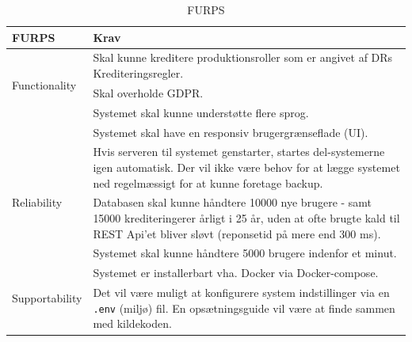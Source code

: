 \begin{table}[ht]
    \centering
    \begin{tabularx}{\textwidth}{|p{3.5cm}|X|}
        \hline
        \textbf{FURPS}                      & \textbf{Krav} \\ 
        \hline
        \multirow{3}{*}{Functionality}      & Skal kunne kreditere produktionsroller som er angivet af DRs Krediteringsregler.  \\ \cline{2-2} 
                                            & Skal overholde GDPR. \\ \hline
        \multirow{2}{*}{Usability}          & Systemet skal kunne understøtte flere sprog. \\ \cline{2-2}
                                            & Systemet skal have en responsiv brugergrænseflade (UI). \\ \hline
        \multirow{3}{*}{Reliability}        & Hvis serveren til systemet genstarter, startes del-systemerne igen automatisk. Der vil ikke være behov for at lægge systemet ned regelmæssigt for at kunne foretage backup. \\ \hline
        \multirow{4}{*}{Performance}        & Databasen skal kunne håndtere 10000 nye brugere - samt 15000 krediteringerer årligt i 25 år, uden at ofte brugte kald til REST Api'et bliver sløvt (reponsetid på mere end 300 ms). \\ \cline{2-2}
                                            & Systemet skal kunne håndtere 5000 brugere indenfor et minut.\\ \hline
        \multirow{4}{*}{Supportability}     & Systemet er installerbart vha. Docker via Docker-compose.\\ \cline{2-2}
                                            & Det vil være muligt at konfigurere system indstillinger via en \texttt{.env} (miljø) fil. En opsætningsguide vil være at finde sammen med kildekoden. \\ \hline
    \end{tabularx}
    \caption{FURPS}
    \label{tab:furps}
\end{table}